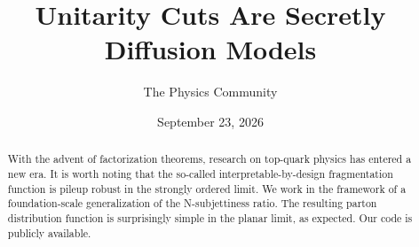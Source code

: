 \documentclass[11pt]{article}
\title{Unitarity Cuts Are Secretly Diffusion Models}
\author{The Physics Community}
\date{September 23, 2026}
\numberwithin{equation}{section}
\theoremstyle{definition}
\theoremstyle{remark}
\begin{document}
\maketitle
\begin{abstract}
With the advent of factorization theorems, research on top-quark physics
has entered a new era. It is worth noting that the so-called
interpretable-by-design fragmentation function is pileup robust in the
strongly ordered limit. We work in the framework of a foundation-scale
generalization of the N-subjettiness ratio. The resulting parton
distribution function is surprisingly simple in the planar limit, as
expected. Our code is publicly available.
\end{abstract}
\tableofcontents





\nocite{*}


\end{document}
